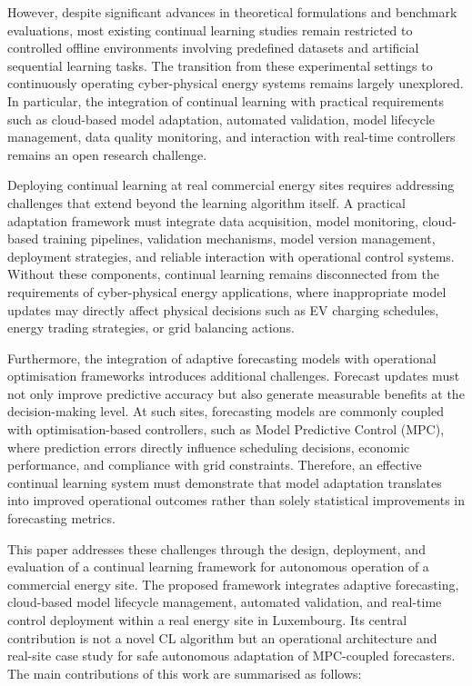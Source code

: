 \documentclass[journal]{IEEEtran}
\begin{document}
However, despite significant advances in theoretical formulations and benchmark evaluations, most existing continual learning studies remain restricted to controlled offline environments involving predefined datasets and artificial sequential learning tasks. The transition from these experimental settings to continuously operating cyber-physical energy systems remains largely unexplored. In particular, the integration of continual learning with practical requirements such as cloud-based model adaptation, automated validation, model lifecycle management, data quality monitoring, and interaction with real-time controllers remains an open research challenge.

Deploying continual learning at real commercial energy sites requires addressing challenges that extend beyond the learning algorithm itself. A practical adaptation framework must integrate data acquisition, model monitoring, cloud-based training pipelines, validation mechanisms, model version management, deployment strategies, and reliable interaction with operational control systems. Without these components, continual learning remains disconnected from the requirements of cyber-physical energy applications, where inappropriate model updates may directly affect physical decisions such as EV charging schedules, energy trading strategies, or grid balancing actions.

Furthermore, the integration of adaptive forecasting models with operational optimisation frameworks introduces additional challenges. Forecast updates must not only improve predictive accuracy but also generate measurable benefits at the decision-making level. At such sites, forecasting models are commonly coupled with optimisation-based controllers, such as Model Predictive Control (MPC), where prediction errors directly influence scheduling decisions, economic performance, and compliance with grid constraints. Therefore, an effective continual learning system must demonstrate that model adaptation translates into improved operational outcomes rather than solely statistical improvements in forecasting metrics.

This paper addresses these challenges through the design, deployment, and evaluation of a continual learning framework for autonomous operation of a commercial energy site. The proposed framework integrates adaptive forecasting, cloud-based model lifecycle management, automated validation, and real-time control deployment within a real energy site in Luxembourg. Its central contribution is not a novel CL algorithm but an operational architecture and real-site case study for safe autonomous adaptation of MPC-coupled forecasters. The main contributions of this work are summarised as follows:
\end{document}
